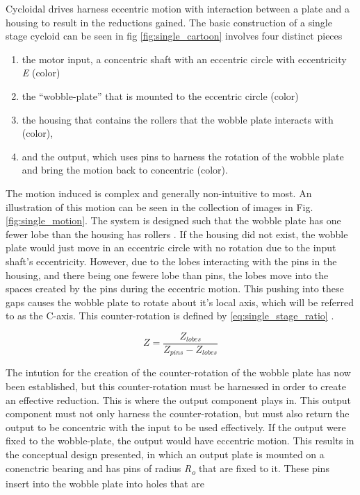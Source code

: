 Cycloidal drives harness eccentric motion with interaction between a plate and a housing to result in the reductions gained. The basic construction of a single stage cycloid can be seen in fig \ref{fig:single_cartoon} involves four distinct pieces
\begin{enumerate}
	\item the motor input, a concentric shaft with an eccentric circle with eccentricity \textit{E} (color)
	\item the ``wobble-plate'' that is mounted to the eccentric circle (color)
	\item the housing that contains the rollers that the wobble plate interacts with (color),
	\item and the output, which uses pins to harness the rotation of the wobble plate and bring the motion back to concentric (color).
\end{enumerate}
The motion induced is complex and generally non-intuitive to most. An illustration of this motion can be seen in the collection of images in Fig. \ref{fig:single_motion}. The system is designed such that the wobble plate has one fewer lobe than the housing has rollers \cite{Pollit}. If the housing did not exist, the wobble plate would just move in an eccentric circle with no rotation due to the input shaft's eccentricity. However, due to the lobes interacting with the pins in the housing, and there being one fewere lobe than pins, the lobes move into the spaces created by the pins during the eccentric motion. This pushing into these gaps causes the wobble plate to rotate about it's local axis, which will be referred to as the C-axis. This counter-rotation is defined by \ref{eq:single_stage_ratio} \cite{ref:on_the_lobe}.

\begin{equation} \label{eq:single_stage_ratio}
Z = \frac{Z_{lobes}} {Z_{pins} - Z_{lobes}}
\end{equation}

The intution for the creation of the counter-rotation of the wobble plate has now been established, but this counter-rotation must be harnessed in order to create an effective reduction. This is where the output component plays in. This output component must not only harness the counter-rotation, but must also return the output to be concentric with the input to be used effectively. If the output were fixed to the wobble-plate, the output would have eccentric motion. This results in the conceptual design presented, in which an output plate is mounted on a conenctric bearing and has pins of radius \textit{R\textsubscript{o}} that are fixed to it. These pins insert into the wobble plate into holes that are 


